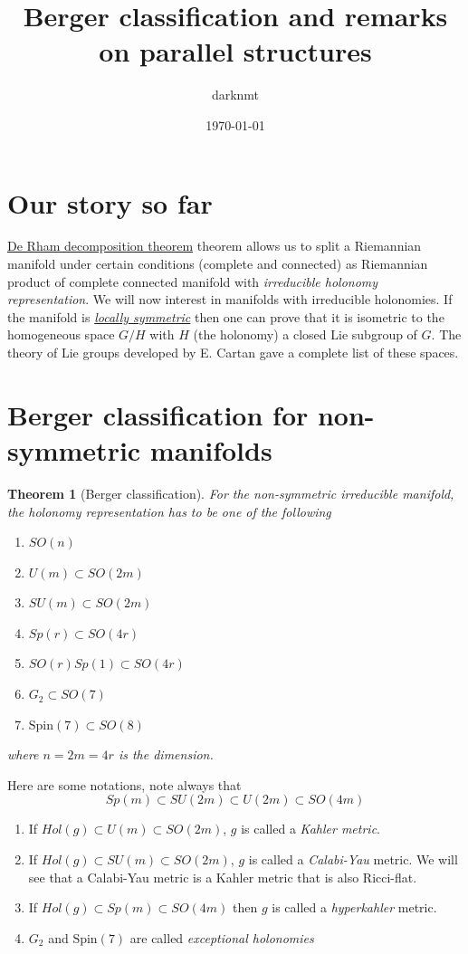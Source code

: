 \documentclass[11pt]{article}
\author{darknmt}
\date{\today}
\title{Berger classification and remarks on parallel structures}
\newtheorem{theorem}{Theorem}
\begin{document}
\maketitle
\tableofcontents


\section*{Our story so far}
\label{sec:orgfedf8a0}

\href{./de-rham-decomposition.org}{De Rham decomposition theorem} theorem allows us to split a Riemannian manifold under certain
conditions (complete and connected) as Riemannian product of complete connected manifold with
\emph{irreducible holonomy representation}. We will now interest in manifolds with irreducible
holonomies. If the manifold is \href{./symmetric-space.org}{\emph{locally symmetric}} then one can prove that it is isometric to the
homogeneous space \(G/H\) with \(H\) (the holonomy) a closed Lie subgroup of \(G\). The theory of Lie
groups developed by E. Cartan gave a complete list of these spaces.


\section*{Berger classification for non-symmetric manifolds}
\label{sec:org5f6d1a3}

\begin{theorem}[Berger classification]
\label{thm:Berger}
\label{org6a9dd7b}
For the non-symmetric irreducible manifold, the holonomy representation has to be one of the
following
\begin{enumerate}
\item \(SO(n)\)
\item \(U(m)\subset SO(2m)\)
\item \(SU(m)\subset SO(2m)\)
\item \(Sp(r) \subset SO(4r)\)
\item \(SO(r)Sp(1) \subset SO(4r)\)
\item \(G_2\subset SO(7)\)
\item \(\text{Spin}(7)\subset SO(8)\)
\end{enumerate}
where \(n=2m=4r\) is the dimension.
\end{theorem}

Here are some notations, note always that
\[
Sp(m)\subset SU(2m)\subset U(2m)\subset SO(4m)
\]
\begin{enumerate}
\item If \(Hol(g)\subset U(m)\subset SO(2m)\), \(g\) is called a \emph{Kahler metric}.
\item If \(Hol(g)\subset SU(m)\subset SO(2m)\), \(g\) is called a \emph{Calabi-Yau} metric. We will see that a
Calabi-Yau metric is a Kahler metric that is also Ricci-flat.
\item If \(Hol(g)\subset Sp(m)\subset SO(4m)\) then \(g\) is called a \emph{hyperkahler} metric.
\item \(G_2\) and \(\text{Spin}(7)\) are called \emph{exceptional holonomies}
\end{enumerate}
\end{document}
